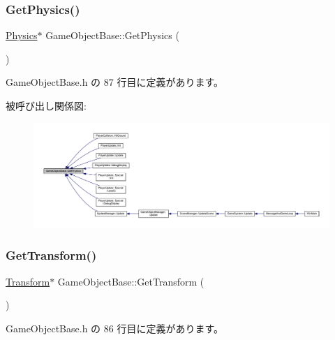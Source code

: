 \subsubsection{\texorpdfstring{Get\+Physics()}{GetPhysics()}}
{\footnotesize\ttfamily \mbox{\hyperlink{class_physics}{Physics}}$\ast$ Game\+Object\+Base\+::\+Get\+Physics (\begin{DoxyParamCaption}{ }\end{DoxyParamCaption})\hspace{0.3cm}{\ttfamily [inline]}}



 Game\+Object\+Base.\+h の 87 行目に定義があります。

被呼び出し関係図\+:
\nopagebreak
\begin{figure}[H]
\begin{center}
\leavevmode
\includegraphics[width=350pt]{class_game_object_base_a853cdb5dbb2edf28e45e49540f85e554_icgraph}
\end{center}
\end{figure}
\mbox{\label{class_game_object_base_a7df1e16838f8fa578a27e8ba64652b49}} 
\subsubsection{\texorpdfstring{Get\+Transform()}{GetTransform()}}
{\footnotesize\ttfamily \mbox{\hyperlink{class_transform}{Transform}}$\ast$ Game\+Object\+Base\+::\+Get\+Transform (\begin{DoxyParamCaption}{ }\end{DoxyParamCaption})\hspace{0.3cm}{\ttfamily [inline]}}



 Game\+Object\+Base.\+h の 86 行目に定義があります。

